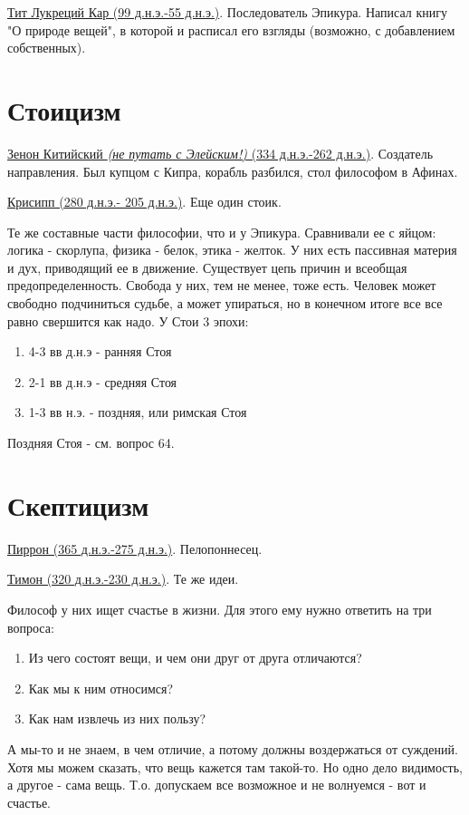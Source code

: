 \documentclass[12pt,a4paper]{article}
\begin{document}
\underline{Тит Лукреций Кар (99 д.н.э.-55 д.н.э.)}. Последователь Эпикура. Написал книгу "О природе вещей", в которой и расписал его взгляды (возможно, с добавлением собственных).

\section{Стоицизм}

\underline{Зенон Китийский \textit{(не путать с Элейским!)} (334 д.н.э.-262 д.н.э.)}. Создатель направления. Был купцом с Кипра, корабль разбился, стол философом в Афинах. 

\underline{Крисипп (280 д.н.э.- 205 д.н.э.)}. Еще один стоик.

Те же составные части философии, что и у Эпикура. Сравнивали ее с яйцом: логика - скорлупа, физика - белок, этика - желток.
У них есть пассивная материя и дух, приводящий ее в движение. Существует цепь причин и всеобщая предопределенность. Свобода у них, тем не менее, тоже есть. Человек может свободно подчиниться судьбе, а может упираться, но в конечном итоге все все равно свершится как надо. У Стои 3 эпохи:
\begin{enumerate}
\item 4-3 вв д.н.э - ранняя Стоя
\item 2-1 вв д.н.э - средняя Стоя
\item 1-3 вв н.э. - поздняя, или римская Стоя
\end{enumerate}
Поздняя Стоя - см. вопрос 64.

\section{Скептицизм}

\underline{Пиррон (365 д.н.э.-275 д.н.э.)}. Пелопоннесец.

\underline{Тимон (320 д.н.э.-230 д.н.э.)}. Те же идеи.

Философ у них ищет счастье в жизни. Для этого ему нужно ответить на три вопроса:
\begin{enumerate}
\item Из чего состоят вещи, и чем они друг от друга отличаются?
\item Как мы к ним относимся?
\item Как нам извлечь из них пользу?
\end{enumerate}
А мы-то и не знаем, в чем отличие, а потому должны воздержаться от суждений. Хотя мы можем сказать, что вещь кажется там такой-то. Но одно дело видимость, а другое - сама вещь. Т.о. допускаем все возможное и не волнуемся - вот и счастье.
\end{document}
